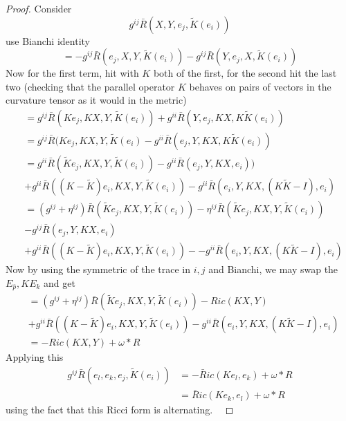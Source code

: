 \documentclass[12pt,letterpaper]{amsart}%
\numberwithin{mycounter}{section}
\theoremstyle{plain}
\numberwithin{equation}{section}
\theoremstyle{definition}
\begin{document}
\begin{proof}
Consider
\[
g^{ij}\bar{R}(X,Y,e_{j},\tilde{K}(e_{i}))
\]
use Bianchi identity
\[
=-g^{ij}\bar{R}(e_{j},X,Y,\tilde{K}(e_{i}))-g^{ij}\bar{R}(Y,e_{j},X,\tilde
{K}(e_{i}))
\]
Now for the first term, hit with $K$ both of the first, for the second hit the
last two (checking that the parallel operator $K$ behaves on pairs of vectors
in the curvature tensor as it would in the metric)\
\begin{align*}
&  =g^{ij}\bar{R}(Ke_{j},KX,Y,\tilde{K}(e_{i}))+g^{ii}\bar{R}(Y,e_{j}%
,KX,K\tilde{K}(e_{i}))\\
&  =g^{ij}\bar{R}(Ke_{j},KX,Y,\tilde{K}(e_{i})-g^{ii}\bar{R}(e_{j}%
,Y,KX,K\tilde{K}(e_{i}))\\
&  =g^{ii}\bar{R}(\tilde{K}e_{j},KX,Y,\tilde{K}(e_{i}))-g^{ii}\bar{R}%
(e_{j},Y,KX,e_{i}))\\
&  +g^{ii}\bar{R}(\left(  K-\tilde{K}\right)  e_{i},KX,Y,\tilde{K}%
(e_{i}))-g^{ii}\bar{R}(e_{i},Y,KX,\left(  K\tilde{K}-I\right)  ,e_{i})\\
&  =\left(  g^{ij}+\eta^{ij}\right)  \bar{R}(\tilde{K}e_{j},KX,Y,\tilde
{K}(e_{i}))-\eta^{ij}\bar{R}(\tilde{K}e_{j},KX,Y,\tilde{K}(e_{i}))\\
&  -g^{ij}\bar{R}(e_{j},Y,KX,e_{i})\\
&  +g^{ii}\bar{R}(\left(  K-\tilde{K}\right)  e_{i},KX,Y,\tilde{K}%
(e_{i}))--g^{ii}\bar{R}(e_{i},Y,KX,\left(  K\tilde{K}-I\right)  ,e_{i})
\end{align*}
Now by using the symmetric of the trace in $i,j$ and Bianchi, we may swap the
$E_{\bar{p}},KE_{k}$ and get%
\begin{align*}
&  =\left(  g^{ij}+\eta^{ij}\right)  \bar{R}(\tilde{K}e_{j},KX,Y,\tilde
{K}(e_{i}))-Ric(KX,Y)\\
&  +g^{ii}\bar{R}(\left(  K-\tilde{K}\right)  e_{i},KX,Y,\tilde{K}%
(e_{i}))-g^{ii}\bar{R}(e_{i},Y,KX,\left(  K\tilde{K}-I\right)  ,e_{i})\\
&  =-Ric(KX,Y)+\omega\ast R
\end{align*}
Applying this
\begin{align*}
g^{ij}\bar{R}(e_{l},e_{k},e_{j},\tilde{K}(e_{i}))  &  =-\bar{R}ic(Ke_{l}%
,e_{k})+\omega\ast R\\
&  =\bar{R}ic(Ke_{k},e_{l})+\omega\ast R
\end{align*}
using the fact that this Ricci form is alternating. \ 
\end{proof}


\fi











\end{document}
